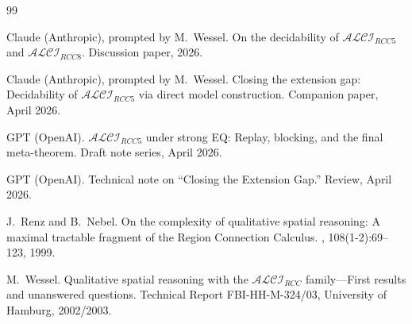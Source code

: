 \documentclass[a4paper,11pt]{article}
\theoremstyle{definition}
\begin{document}
\begin{thebibliography}{99}

Claude (Anthropic), prompted by M.~Wessel.
\newblock On the decidability of $\mathcal{ALCI}_{\mathit{RCC5}}$ and
  $\mathcal{ALCI}_{\mathit{RCC8}}$.
\newblock Discussion paper, 2026.

Claude (Anthropic), prompted by M.~Wessel.
\newblock Closing the extension gap: Decidability of
  $\mathcal{ALCI}_{\mathit{RCC5}}$ via direct model construction.
\newblock Companion paper, April 2026.

GPT (OpenAI).
\newblock $\mathcal{ALCI}_{\mathit{RCC5}}$ under strong EQ: Replay,
  blocking, and the final meta-theorem.
\newblock Draft note series, April 2026.

GPT (OpenAI).
\newblock Technical note on ``Closing the Extension Gap.''
\newblock Review, April 2026.

J.~Renz and B.~Nebel.
\newblock On the complexity of qualitative spatial reasoning: A
  maximal tractable fragment of the {Region Connection Calculus}.
, 108(1-2):69--123, 1999.

M.~Wessel.
\newblock Qualitative spatial reasoning with the
  {$\mathcal{ALCI}_\mathit{RCC}$} family---{F}irst results and
  unanswered questions.
\newblock Technical Report FBI-HH-M-324/03, University of Hamburg,
  2002/2003.

\end{thebibliography}
\end{document}
